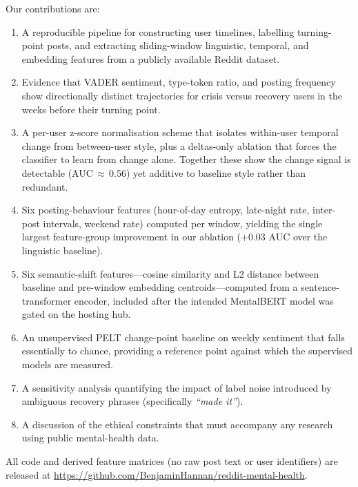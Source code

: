 \documentclass[11pt]{article}
\begin{document}
Our contributions are:
\begin{enumerate}
  \item A reproducible pipeline for constructing user timelines, labelling
        turning-point posts, and extracting sliding-window linguistic,
        temporal, and embedding features from a publicly available
        Reddit dataset.
  \item Evidence that VADER sentiment, type-token ratio, and posting frequency
        show directionally distinct trajectories for crisis versus recovery
        users in the weeks before their turning point.
  \item A per-user z-score normalisation scheme that isolates within-user
        temporal change from between-user style, plus a deltas-only
        ablation that forces the classifier to learn from change alone.
        Together these show the change signal is detectable (AUC\,$\approx$\,0.56)
        yet additive to baseline style rather than redundant.
  \item Six posting-behaviour features (hour-of-day entropy, late-night rate,
        inter-post intervals, weekend rate) computed per window, yielding
        the single largest feature-group improvement in our ablation
        ($+0.03$ AUC over the linguistic baseline).
  \item Six semantic-shift features---cosine similarity and L2 distance
        between baseline and pre-window embedding centroids---computed
        from a sentence-transformer encoder, included after the intended
        MentalBERT model was gated on the hosting hub.
  \item An unsupervised PELT change-point baseline on weekly sentiment
        that falls essentially to chance, providing a reference point
        against which the supervised models are measured.
  \item A sensitivity analysis quantifying the impact of label noise
        introduced by ambiguous recovery phrases (specifically
        \emph{``made it''}).
  \item A discussion of the ethical constraints that must accompany any
        research using public mental-health data.
\end{enumerate}

All code and derived feature matrices (no raw post text or user identifiers)
are released at \url{https://github.com/BenjaminHannan/reddit-mental-health}.

\end{document}
